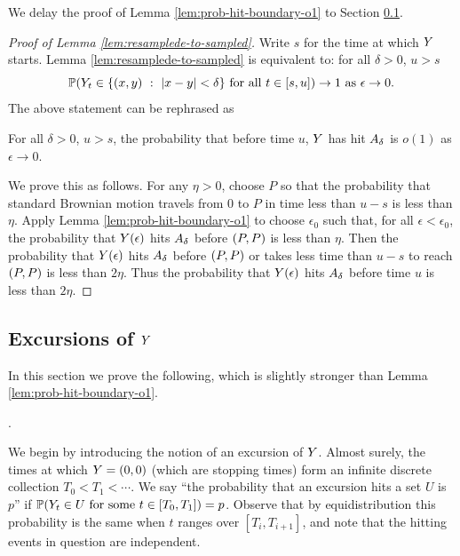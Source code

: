 {We delay the proof of Lemma \ref{lem:prob-hit-boundary-o1} to Section
\ref{subsec:excursions-of-twodim}.

\begin{proof}[Proof of Lemma \ref{lem:resamplede-to-sampled}]

Write $s$ for the time at which $Y$ starts.
Lemma \ref{lem:resamplede-to-sampled} is equivalent to: for all $\delta > 0$, $u > s$
\[
\P(\twodim_t \in \{(x,y) \ :\  |x-y|<\delta \} \text{ for all } t \in [s,u])\to1 \text{ as } \epsilon\to 0.
\]
The above statement can be rephrased as

\vspace{12pt}
For all $\delta > 0$, $u > s$,
the probability that before time $u$, $Y$ has hit $A_\delta$
is $o(1)$ as $\epsilon \to 0$.
\vspace{12pt}

  We prove this as follows.  For any $\eta > 0$,
  choose $P$ so that the probability that standard Brownian motion
  travels from $0$ to $P$ in time less than $u-s$ is less than
  $\eta$.
  Apply Lemma \ref{lem:prob-hit-boundary-o1} to
  choose $\epsilon_0$ such that, for all $\epsilon < \epsilon_0$, the probability that $Y(\epsilon)$ hits
  $A_\delta$ before $(P,P)$ is less than $\eta$.
  Then the probability that $Y(\epsilon)$ hits $A_\delta$ before $(P,P)$
  or takes less time than $u-s$ to reach $(P,P)$ is
  less than $2\eta$.
  Thus the probability that $Y(\epsilon)$ hits $A_\delta$ before
  time $u$ is less than $2\eta$.
\end{proof}

\subsection{Excursions of $Y$}
\label{subsec:excursions-of-twodim}

In this section we prove the following, which is slightly stronger than
Lemma \ref{lem:prob-hit-boundary-o1}.

\newcommand{\loger}{\log 1/\epsilon}

\begin{lemma}\label{lem:prob-hit-boundary-o1loge}
  \probhitboundaryis{$O(\frac{1}{\loger})$}.
\end{lemma}

\newcommand{\origin}{(0,0)}

\newcommand{\excursionstart}{T}
  We begin by introducing the notion of an excursion of $Y$.
  Almost surely, the times at which $\twodim = \origin$ (which are stopping
  times) form an infinite discrete collection $\excursionstart_0 <
  \excursionstart_1 < \cdots$. We say ``the probability that an excursion
  hits a set $U$ is $p$'' if $\P(\twodim_t\in U \text{
  for some } t\in [\excursionstart_0, \excursionstart_{1}]) = p$.
  Observe that by equidistribution this probability is the same when
  $t$ ranges over $[\excursionstart_i, \excursionstart_{i+1}]$, and
  note that the hitting events in question are independent.

}
